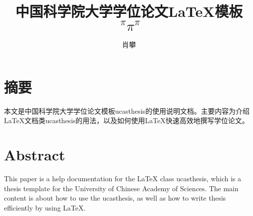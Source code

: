 \confidential{}%
\title{中国科学院大学学位论文\LaTeX{}模板 {$~^{\pi}\pi^{\pi}$}}%
\author{肖攀}%
\maketitle
\makeenglishtitle
\makedeclaration
\chapter{摘\quad 要}
\setcounter{page}{1}%

本文是中国科学院大学学位论文模板ucasthesis的使用说明文档。主要内容为介绍\LaTeX{}文档类ucasthesis的用法，以及如何使用\LaTeX{}快速高效地撰写学位论文。

\chapter{Abstract}

This paper is a help documentation for the \LaTeX{} class ucasthesis, which is  a thesis template for the University of Chinese Academy of Sciences. The main content is about how to use the ucasthesis, as well as how to write thesis efficiently by using \LaTeX{}.

